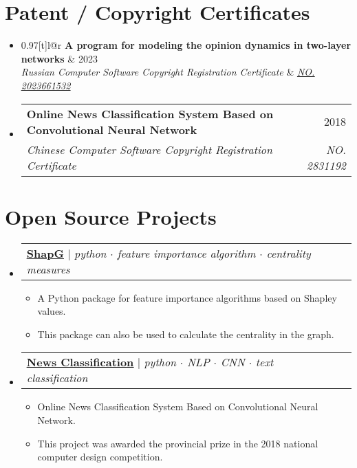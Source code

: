 \documentclass[letterpaper,10pt]{article}
\makeatletter
\newcommand{\link}[2]{\href{#1}{\color{blue}\underline{#2}}}
\newcommand{\resumeItem}[1]{
  \item\small{
    {#1 \vspace{-2pt}}
  }
}
\newcommand{\resumeSubheading}[4]{
  \vspace{-2pt}\item
  \begin{tabular*}{0.97\textwidth}[t]{l@{\extracolsep{\fill}}r}
    \textbf{#1} & #2 \\
    \textit{\small#3} & \textit{\small #4} \\
  \end{tabular*}\vspace{-7pt}
}
\newcommand{\resumeProjectHeading}[2]{
  \item
  \begin{tabular*}{0.97\textwidth}{l@{\extracolsep{\fill}}r}
    \small#1 & #2 \\
  \end{tabular*}\vspace{-7pt}
}
\newenvironment{resumeSubHeadingList}{\begin{itemize}[leftmargin=0.15in, label={}]}{\end{itemize}}
\newenvironment{resumeItemList}{\begin{itemize}}{\end{itemize}}
\makeatother
\begin{document}
\section{Patent / Copyright Certificates}
\begin{resumeSubHeadingList}
  \resumeSubheading
    {A program for modeling the opinion dynamics in two-layer networks}{2023}
    {Russian Computer Software Copyright Registration Certificate}{{\link{https://new.fips.ru/registers-doc-view/fips_servlet?DB=EVM&DocNumber=2023661532&TypeFile=html}{NO.
      2023661532}}}

  \resumeSubheading
    {Online News Classification System Based on Convolutional Neural Network}{2018}
    {Chinese Computer Software Copyright Registration Certificate}{NO. 2831192}
\end{resumeSubHeadingList}

\section{Open Source Projects}
\begin{resumeSubHeadingList}

  \resumeProjectHeading{
    \link{https://github.com/vectorsss/shapG}{\textbf{ShapG}} $|$
    \emph{python $\cdot$ feature importance algorithm $\cdot$ centrality
          measures}}{}
  \begin{resumeItemList}
    \resumeItem{A Python package for feature importance algorithms based on
                Shapley values.}
    \resumeItem{This package can also be used to calculate the centrality in
                the graph.}
  \end{resumeItemList}

  \resumeProjectHeading{
    \link{https://github.com/vectorsss/news_classification}{\textbf{News
          Classification}} $|$
    \emph{python $\cdot$ NLP $\cdot$ CNN $\cdot$ text classification}}{}
  \begin{resumeItemList}
    \resumeItem{Online News Classification System Based on Convolutional Neural
                Network.}
    \resumeItem{This project was awarded the provincial  prize in the
                2018 national computer design competition.}
  \end{resumeItemList}
\end{resumeSubHeadingList}
\end{document}
